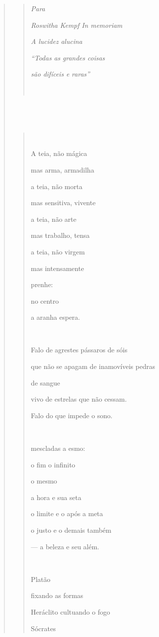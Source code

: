 \begin{verse}
\begin{quote}
\emph{Para}

\emph{Roswitha Kempf In memoriam}

\emph{A lucidez alucina}

\emph{``Todas as grandes coisas}

\emph{são difíceis e raras''}


\end{quote}

\subsection{}\label{section-9}

\begin{quote}


A teia, não mágica

mas arma, armadilha

a teia, não morta

mas sensitiva, vivente

a teia, não arte

mas trabalho, tensa

a teia, não virgem

mas intensamente

prenhe:

no centro

a aranha espera.



Falo de agrestes pássaros de sóis

que não se apagam de inamovíveis pedras

de sangue

vivo de estrelas que não cessam.

Falo do que impede o sono.



mescladas a esmo:

o fim o infinito

o mesmo

a hora e sua seta

o limite e o após a meta

o justo e o demais também

--- a beleza e seu além.



Platão

fixando as formas

Heráclito cultuando o fogo

Sócrates


\end{quote}
\end{verse}
